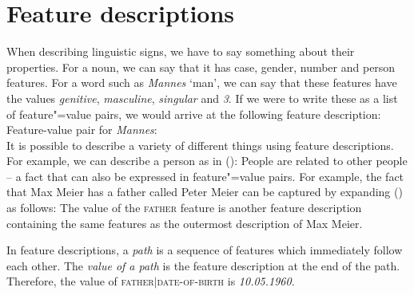 \section{Feature descriptions}

When describing linguistic signs, we have to say something about their
properties. For a noun, we can say that it has case, gender, number and person features. For a word
such as  \emph{Mannes} `man', we can say that these features have the values \emph{genitive},
\emph{masculine}, \emph{singular} and \emph{3}. If we were to write these as a list of
feature"=value pairs, we would arrive at the following feature description: 
\eas
Feature-value pair for \emph{Mannes}:\\
\zs
It is possible to describe a variety of different things using feature descriptions. For example, we can describe a person as in ():
\ea
{}
\z
People are related to other people -- a fact that can also be expressed in feature"=value pairs. For example, the fact that Max Meier has a father
called Peter Meier can be captured by expanding () as follows: 
\ea
{}
\z
The value of the \textsc{father} feature is another feature description containing the same features
as the outermost description of Max Meier.

\addlines
In feature descriptions, a \emph{path} is a sequence of features which immediately follow each other.
The \emph{value of a path} is the feature description at the end of the path. Therefore,
the value of \textsc{father$|$date-of-birth} is \emph{10.05.1960}.

